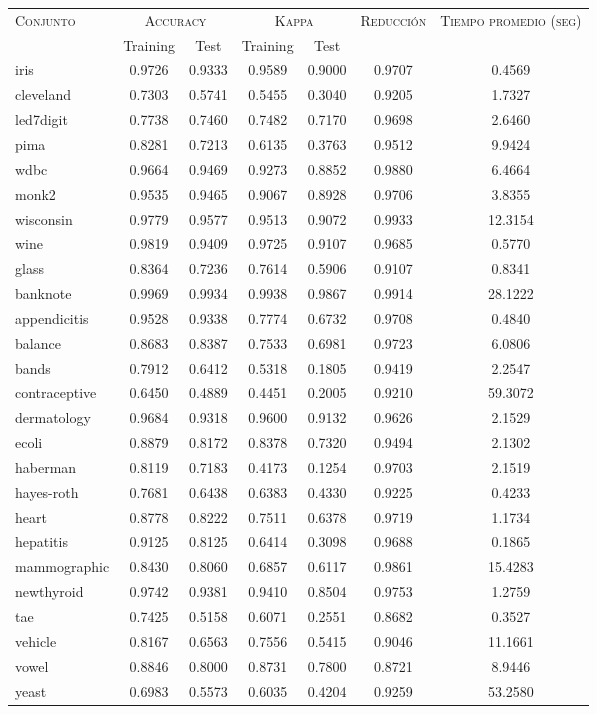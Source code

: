 \begin{table}[]
\centering
\begin{tabular}{l c c c c c c}
\hline
\multirow{2}{*}{\textsc{Conjunto}}
	& \multicolumn{2}{c}{\textsc{Accuracy}}
	& \multicolumn{2}{c}{\textsc{Kappa}}
	& \textsc{Reducción}
	& \textsc{Tiempo promedio (seg)} \\
	& Training & Test
	& Training & Test \\ 
\hline
\hline

iris & 0.9726 & 0.9333 & 0.9589 & 0.9000 & 0.9707 & 0.4569 \\
cleveland & 0.7303 & 0.5741 & 0.5455 & 0.3040 & 0.9205 & 1.7327 \\
led7digit & 0.7738 & 0.7460 & 0.7482 & 0.7170 & 0.9698 & 2.6460 \\
pima & 0.8281 & 0.7213 & 0.6135 & 0.3763 & 0.9512 & 9.9424 \\
wdbc & 0.9664 & 0.9469 & 0.9273 & 0.8852 & 0.9880 & 6.4664 \\
monk2 & 0.9535 & 0.9465 & 0.9067 & 0.8928 & 0.9706 & 3.8355 \\
wisconsin & 0.9779 & 0.9577 & 0.9513 & 0.9072 & 0.9933 & 12.3154 \\
wine & 0.9819 & 0.9409 & 0.9725 & 0.9107 & 0.9685 & 0.5770 \\
glass & 0.8364 & 0.7236 & 0.7614 & 0.5906 & 0.9107 & 0.8341 \\
banknote & 0.9969 & 0.9934 & 0.9938 & 0.9867 & 0.9914 &  28.1222 \\
appendicitis & 0.9528 & 0.9338 & 0.7774 & 0.6732 & 0.9708 & 0.4840 \\
balance & 0.8683 & 0.8387 & 0.7533 & 0.6981 & 0.9723 & 6.0806 \\
bands & 0.7912 & 0.6412 & 0.5318 & 0.1805 & 0.9419 & 2.2547 \\
contraceptive & 0.6450 & 0.4889 & 0.4451 & 0.2005 & 0.9210 &  59.3072 \\
dermatology & 0.9684 & 0.9318 & 0.9600 & 0.9132 & 0.9626 & 2.1529 \\
ecoli & 0.8879 & 0.8172 & 0.8378 & 0.7320 & 0.9494 & 2.1302 \\
haberman & 0.8119 & 0.7183 & 0.4173 & 0.1254 & 0.9703 & 2.1519 \\
hayes-roth & 0.7681 & 0.6438 & 0.6383 & 0.4330 & 0.9225 & 0.4233 \\
heart & 0.8778 & 0.8222 & 0.7511 & 0.6378 & 0.9719 & 1.1734 \\
hepatitis & 0.9125 & 0.8125 & 0.6414 & 0.3098 & 0.9688 & 0.1865 \\
mammographic & 0.8430 & 0.8060 & 0.6857 & 0.6117 & 0.9861 &  15.4283 \\
newthyroid & 0.9742 & 0.9381 & 0.9410 & 0.8504 & 0.9753 & 1.2759 \\
tae & 0.7425 & 0.5158 & 0.6071 & 0.2551 & 0.8682 & 0.3527 \\
vehicle & 0.8167 & 0.6563 & 0.7556 & 0.5415 & 0.9046 & 11.1661 \\
vowel & 0.8846 & 0.8000 & 0.8731 & 0.7800 & 0.8721 & 8.9446 \\
yeast & 0.6983 & 0.5573 & 0.6035 & 0.4204 & 0.9259 &  53.2580 \\


\end{tabular}
\end{table}
